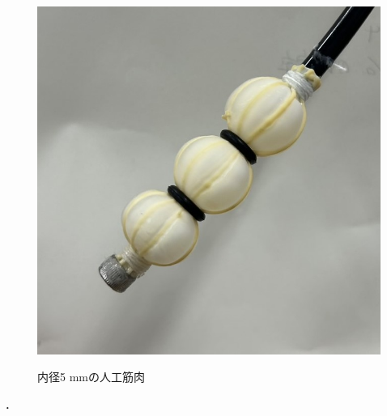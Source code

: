 \begin{figure}[ht]
\begin{minipage}{0.49\columnwidth}
      \label{fig:inn}
    \end{minipage}
    \begin{minipage}{0.49\columnwidth}
      \vspace{4mm}
      \centering
      \includegraphics[scale=0.3]{pic/E.jpg}
      \label{fig:ato}
    \end{minipage}
    \caption{内径5 mmの人工筋肉}
    \label{fig:zzA}
  \end{figure}．
